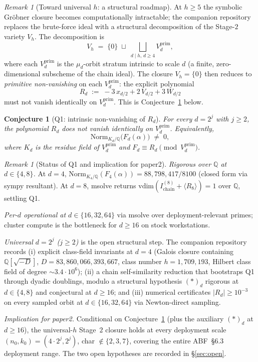 \documentclass[11pt]{article}
\newtheorem{conjecture}[theorem]{Conjecture}
\theoremstyle{definition}
\theoremstyle{remark}
\newtheorem{remark}[theorem]{Remark}
\begin{document}
\begin{remark}[Toward universal $h$: a structural roadmap]
\label{rem:universal-h-structural}
At $h \geq 5$ the symbolic Gr\"obner closure becomes computationally
intractable; the companion repository~\cite{CompanionRepo} replaces
the brute-force ideal with a structural decomposition of the Stage-$2$
variety $V_h$. The decomposition is
\[
 V_h \;=\; \{0\} \;\sqcup\; \bigsqcup_{d \mid h,\, d \geq 4}
 V_d^{\mathrm{prim}},
\]
where each $V_d^{\mathrm{prim}}$ is the $\mu_d$-orbit stratum
intrinsic to scale $d$ (a finite, zero-dimensional subscheme of
the chain ideal). The closure $V_h = \{0\}$ then reduces to
\emph{primitive non-vanishing} on each $V_d^{\mathrm{prim}}$:
the explicit polynomial
\[
 R_d \;:=\; -3\,x_{d/2} + 2\,V_{d/2} + 3\,W_{d/2}
\]
must not vanish identically on $V_d^{\mathrm{prim}}$. This is
Conjecture~\ref{conj:Q1} below.
\end{remark}

\begin{conjecture}[Q1: intrinsic non-vanishing of $R_d$]
\label{conj:Q1}
For every $d = 2^j$ with $j \geq 2$, the polynomial $R_d$ does not
vanish identically on $V_d^{\mathrm{prim}}$. Equivalently,
\[
 \mathrm{Norm}_{K_d / \mathbb{Q}}\bigl(F_d(\alpha)\bigr) \;\neq\; 0,
\]
where $K_d$ is the residue field of $V_d^{\mathrm{prim}}$ and
$F_d \equiv R_d \pmod{V_d^{\mathrm{prim}}}$.
\end{conjecture}

\begin{remark}[Status of Q1 and implication for paper2]
\label{rem:Q1-induction-framework}
\emph{Rigorous over $\mathbb{Q}$ at $d \in \{4, 8\}$.} At $d = 4$,
$\mathrm{Norm}_{K_4/\mathbb{Q}}(F_4(\alpha)) = 88{,}798{,}417/8100$
(closed form via sympy resultant). At $d = 8$, msolve returns
$\mathrm{vdim}(I_{\mathrm{chain}}^{(8)} + \langle R_8 \rangle) = 1$
over $\mathbb{Q}$, settling Q1.

\emph{Per-$d$ operational at $d \in \{16, 32, 64\}$} via msolve
over deployment-relevant primes; cluster compute is the bottleneck
for $d \geq 16$ on stock workstations.

\emph{Universal $d = 2^j$ ($j \geq 2$)} is the open structural step.
The companion repository~\cite{CompanionRepo} records (i) explicit
class-field invariants at $d = 4$ (Galois closure containing
$\mathbb{Q}[\sqrt{-D}]$, $D = 83{,}860{,}066{,}393{,}667$, class
number $h = 1{,}709{,}193$, Hilbert class field of degree
${\sim}3.4 \cdot 10^6$); (ii) a chain self-similarity reduction
that bootstraps Q1 through dyadic doublings, modulo a structural
hypothesis $(\ast)_d$ rigorous at $d \in \{4, 8\}$ and conjectural
at $d \geq 16$; and (iii) numerical certificates $|R_d| \geq 10^{-3}$
on every sampled orbit at $d \in \{16, 32, 64\}$ via Newton-direct
sampling.

\emph{Implication for paper2.} Conditional on Conjecture~\ref{conj:Q1}
(plus the auxiliary $(\ast)_d$ at $d \geq 16$), the universal-$h$
Stage~$2$ closure holds at every deployment scale
$(n_0, k_0) = (4 \cdot 2^j, 2^j)$, char $\notin \{2, 3, 7\}$,
covering the entire ABF~\S 6.3 deployment range. The two open
hypotheses are recorded in \S\ref{sec:open}.
\end{remark}
\end{document}
